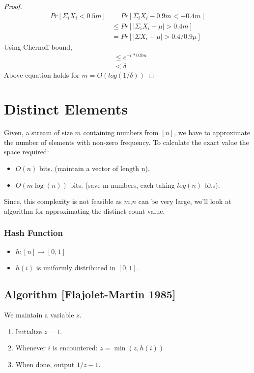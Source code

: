 \documentclass[11pt]{article}
\begin{document}
\begin{proof}
\begin{equation}
\begin{split}
Pr[\Sigma_{i} X_{i} < 0.5m] & = Pr[\Sigma_{i} X_{i} - 0.9m < -0.4m]\\
& \le Pr[|\Sigma_{i} X_{i} - \mu| > 0.4m]\\
& = Pr[|\Sigma X_{i} - \mu| > 0.4/0.9 \mu]
\end{split}
\end{equation}
Using Chernoff bound,
\begin{equation}
\begin{split}
& \leq e^{-c*0.9m}\\
& < \delta
\end{split}
\end{equation}
Above equation holds for $m = O(log(1/\delta))$
\end{proof}

\section{Distinct Elements}
Given, a stream of size $m$ containing numbers from $[n]$, we have to approximate the number of elements with non-zero frequency. To calculate the exact value the space required:

\begin{itemize}
\item $O(n)$ bits. (maintain a vector of length n).
\item $O(m \log (n))$ bits. (save m numbers, each taking $log(n)$ bits).
\end{itemize}

Since, this complexity is not feasible as $m$,$n$ can be very large, we'll look at algorithm for approximating the distinct count value.

\subsubsection{Hash Function}
\begin{itemize}
\item $h : [n] \rightarrow [0,1]$
\item $h(i)$ is uniformly distributed in $[0,1]$.
\end{itemize}

\subsection{Algorithm [Flajolet-Martin 1985]}
We maintain a variable $z$.
\begin{enumerate}
\item Initialize $z = 1$.
\item Whenever $i$ is encountered: $z = \min{(z,h(i))}$
\item When done, output $1/z -1$.
\end{enumerate}
\end{document}
